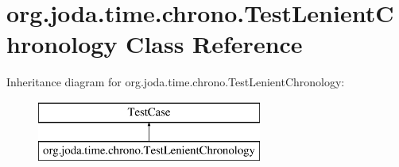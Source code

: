 \hypertarget{classorg_1_1joda_1_1time_1_1chrono_1_1_test_lenient_chronology}{\section{org.\-joda.\-time.\-chrono.\-Test\-Lenient\-Chronology Class Reference}
\label{classorg_1_1joda_1_1time_1_1chrono_1_1_test_lenient_chronology}
}
Inheritance diagram for org.\-joda.\-time.\-chrono.\-Test\-Lenient\-Chronology\-:\begin{figure}[H]
\begin{center}
\leavevmode
\includegraphics[height=2.000000cm]{classorg_1_1joda_1_1time_1_1chrono_1_1_test_lenient_chronology}
\end{center}
\end{figure}
